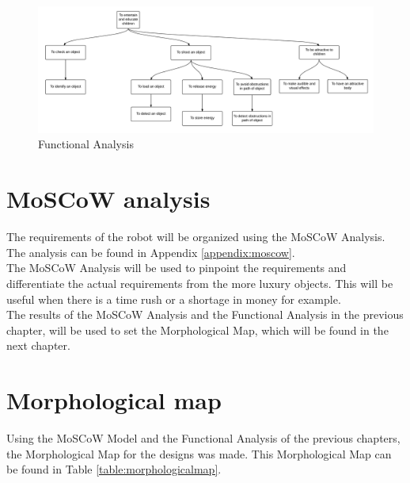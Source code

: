 \documentclass[11pt,twoside,a4paper]{report}
\begin{document}
\begin{figure}[h]
\begin{center}
\includegraphics[width = 17cm]{Images/FunctionalAnalysis.png}
\end{center}
\caption{Functional Analysis}
\label{fig:FuncAnal}
\end{figure}

\chapter{MoSCoW analysis}
The requirements of the robot will be organized using the MoSCoW Analysis. The analysis can be found in Appendix \ref{appendix:moscow}. \\
The MoSCoW Analysis will be used to pinpoint the requirements and differentiate the actual requirements from the more luxury objects. This will be useful when there is a time rush or a shortage in money for example. \\
The results of the MoSCoW Analysis and the Functional Analysis in the previous chapter, will be used to set the Morphological Map, which will be found in the next chapter.

\chapter{Morphological map}
Using the MoSCoW Model and the Functional Analysis of the previous chapters, the Morphological Map for the designs was made. This Morphological Map can be found in Table \ref{table:morphologicalmap}.
\end{document}
